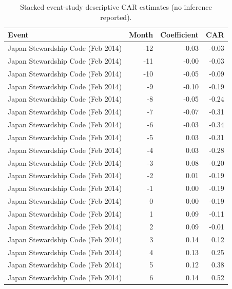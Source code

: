 \begin{table}
\caption{Stacked event-study descriptive CAR estimates (no inference reported).}
\label{tab:event_study_coefs}
\begin{tabular}{lrrr}
\toprule
Event & Month & Coefficient & CAR \\
\midrule
Japan Stewardship Code (Feb 2014) & -12 & -0.03 & -0.03 \\
Japan Stewardship Code (Feb 2014) & -11 & -0.00 & -0.03 \\
Japan Stewardship Code (Feb 2014) & -10 & -0.05 & -0.09 \\
Japan Stewardship Code (Feb 2014) & -9 & -0.10 & -0.19 \\
Japan Stewardship Code (Feb 2014) & -8 & -0.05 & -0.24 \\
Japan Stewardship Code (Feb 2014) & -7 & -0.07 & -0.31 \\
Japan Stewardship Code (Feb 2014) & -6 & -0.03 & -0.34 \\
Japan Stewardship Code (Feb 2014) & -5 & 0.03 & -0.31 \\
Japan Stewardship Code (Feb 2014) & -4 & 0.03 & -0.28 \\
Japan Stewardship Code (Feb 2014) & -3 & 0.08 & -0.20 \\
Japan Stewardship Code (Feb 2014) & -2 & 0.01 & -0.19 \\
Japan Stewardship Code (Feb 2014) & -1 & 0.00 & -0.19 \\
Japan Stewardship Code (Feb 2014) & 0 & 0.00 & -0.19 \\
Japan Stewardship Code (Feb 2014) & 1 & 0.09 & -0.11 \\
Japan Stewardship Code (Feb 2014) & 2 & 0.09 & -0.01 \\
Japan Stewardship Code (Feb 2014) & 3 & 0.14 & 0.12 \\
Japan Stewardship Code (Feb 2014) & 4 & 0.13 & 0.25 \\
Japan Stewardship Code (Feb 2014) & 5 & 0.12 & 0.38 \\
Japan Stewardship Code (Feb 2014) & 6 & 0.14 & 0.52 \\

\end{tabular}
\end{table}
